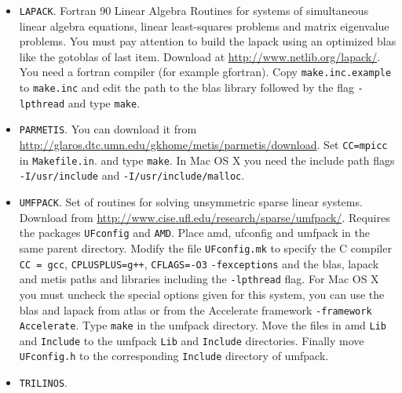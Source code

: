 \begin{itemize}
\item \verb!LAPACK!.
Fortran $90$ Linear Algebra Routines for systems of simultaneous linear algebra equations, linear least-squares problems
and matrix eigenvalue problems. You must pay attention to build the lapack using an optimized blas like the gotoblas of 
last item. Download at \url{http://www.netlib.org/lapack/}. You need a fortran compiler (for example gfortran).
Copy \verb!make.inc.example! to \verb!make.inc! and edit the path to the blas library followed by the flag \verb!-lpthread! 
and type \verb!make!. 

\item \verb!PARMETIS!.
You can download it from \url{http://glaros.dtc.umn.edu/gkhome/metis/parmetis/download}. Set \verb!CC=mpicc! 
in \verb!Makefile.in!. and type \verb!make!. In Mac OS X you need the include path flags
\verb!-I/usr/include! and \verb!-I/usr/include/malloc!.

\item \verb!UMFPACK!.
Set of routines for solving unsymmetric sparse linear systems. 
Download from \url{http://www.cise.ufl.edu/research/sparse/umfpack/}. Requires 
the packages \verb!UFconfig! and \verb!AMD!. Place amd, ufconfig and umfpack in the same parent directory. 
Modify the file \verb!UFconfig.mk! to specify the C compiler \verb!CC = gcc!, \verb!CPLUSPLUS=g++!, 
\verb!CFLAGS=-O3! 
\verb!-fexceptions! 
and the blas, lapack and metis paths and libraries including the \verb!-lpthread! flag. 
For Mac OS X you must uncheck the special options given for this system, you can use the blas and lapack 
from atlas or from the Accelerate framework \verb!-framework Accelerate!. 
Type \verb!make! in 
the umfpack directory. Move the files in amd \verb!Lib! and \verb!Include! to the umfpack \verb!Lib! and \verb!Include! directories.
Finally move \verb!UFconfig.h! to the corresponding \verb!Include! directory of umfpack.  

\item \verb!TRILINOS!.

\end{itemize}



